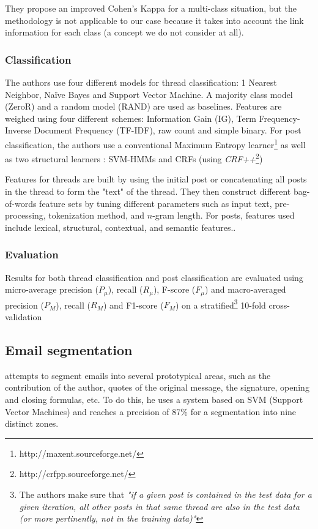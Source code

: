 \documentclass[11pt]{article}
\begin{document}
They propose an improved Cohen's Kappa for a multi-class situation, but the methodology is not applicable to our case because it takes into account the link information for each class (a concept we do not consider at all).

\subsubsection{Classification}

The authors use four different models for thread classification: 1 Nearest Neighbor, Naïve Bayes and Support Vector Machine. A majority class model (ZeroR) and a random model (RAND) are used as baselines. Features are weighed using four different schemes: Information Gain (IG), Term Frequency-Inverse Document Frequency (TF-IDF), raw count and simple binary. For post classification, the authors use a conventional Maximum Entropy learner\footnote{http://maxent.sourceforge.net/} as well as two structural learners : SVM-HMMs and CRFs (using \emph{CRF++}\footnote{http://crfpp.sourceforge.net/
})

Features for threads are built by using the initial post or concatenating all posts in the thread to form the "text" of the thread. They then construct different bag-of-words feature sets by tuning different parameters such as input text, pre-processing, tokenization method, and $n$-gram length. For posts, features used include lexical, structural, contextual, and semantic features..

\subsubsection{Evaluation}

Results for both thread classification and post classification are evaluated using micro-average precision ($P_{\mu}$), recall ($R_{\mu}$), F-score ($F_{\mu}$) and macro-averaged precision ($P_{M}$), recall ($R_{M}$) and F1-score ($F_{M}$) on a stratified\footnote{The authors make sure that \textit{"if a given post is contained in the test data for a given iteration, all other posts in that same thread are also in the test data (or more pertinently, not in the training data)"}} 10-fold cross-validation

\subsection{Email segmentation}

 \cite{lampert2009segmenting} attempts to segment emails into several prototypical areas, such as the contribution of the author, quotes of the original message, the signature, opening and closing formulas, etc. To do this, he uses a system based on SVM (Support Vector Machines) and reaches a precision of 87\% for a segmentation into nine distinct zones.
\end{document}
